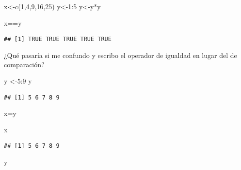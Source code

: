 \documentclass[
]{book}
\newenvironment{Shaded}{\begin{snugshade}}{\end{snugshade}}
\newcommand{\DecValTok}[1]{\textcolor[rgb]{0.00,0.00,0.81}{#1}}
\newcommand{\FunctionTok}[1]{\textcolor[rgb]{0.00,0.00,0.00}{#1}}
\newcommand{\NormalTok}[1]{#1}
\newcommand{\OtherTok}[1]{\textcolor[rgb]{0.56,0.35,0.01}{#1}}
\newcommand{\SpecialCharTok}[1]{\textcolor[rgb]{0.00,0.00,0.00}{#1}}
\begin{document}
\begin{Shaded}
\begin{Highlighting}[]
\NormalTok{x}\OtherTok{\textless{}{-}}\FunctionTok{c}\NormalTok{(}\DecValTok{1}\NormalTok{,}\DecValTok{4}\NormalTok{,}\DecValTok{9}\NormalTok{,}\DecValTok{16}\NormalTok{,}\DecValTok{25}\NormalTok{)}
\NormalTok{y}\OtherTok{\textless{}{-}}\DecValTok{1}\SpecialCharTok{:}\DecValTok{5}
\NormalTok{y}\OtherTok{\textless{}{-}}\NormalTok{y}\SpecialCharTok{*}\NormalTok{y}
\end{Highlighting}
\end{Shaded}

\begin{Shaded}
\begin{Highlighting}[]
\NormalTok{x}\SpecialCharTok{==}\NormalTok{y}
\end{Highlighting}
\end{Shaded}

\begin{verbatim}
## [1] TRUE TRUE TRUE TRUE TRUE
\end{verbatim}

¿Qué pasaría si me confundo y escribo el operador de igualdad en lugar del de comparación?

\begin{Shaded}
\begin{Highlighting}[]
\NormalTok{y }\OtherTok{\textless{}{-}}\DecValTok{5}\SpecialCharTok{:}\DecValTok{9}
\NormalTok{y}
\end{Highlighting}
\end{Shaded}

\begin{verbatim}
## [1] 5 6 7 8 9
\end{verbatim}

\begin{Shaded}
\begin{Highlighting}[]
\NormalTok{x}\OtherTok{=}\NormalTok{y}
\end{Highlighting}
\end{Shaded}

\begin{Shaded}
\begin{Highlighting}[]
\NormalTok{x}
\end{Highlighting}
\end{Shaded}

\begin{verbatim}
## [1] 5 6 7 8 9
\end{verbatim}

\begin{Shaded}
\begin{Highlighting}[]
\NormalTok{y}
\end{Highlighting}
\end{Shaded}
\end{document}

